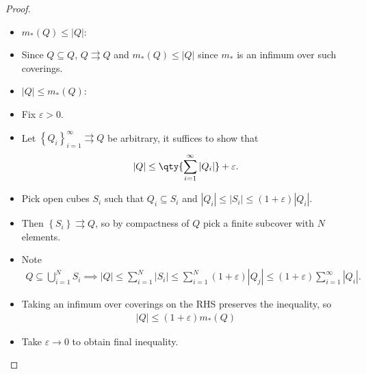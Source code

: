 \begin{solution}

\envlist

\begin{proof}

\envlist

\begin{itemize}
\item
  \(m_*(Q) \leq {\left\lvert {Q} \right\rvert}\):
\item
  Since \(Q\subseteq Q\), \(Q\rightrightarrows Q\) and
  \(m_*(Q) \leq {\left\lvert {Q} \right\rvert}\) since \(m_*\) is an
  infimum over such coverings.
\item
  \({\left\lvert {Q} \right\rvert} \leq m_*(Q)\):
\item
  Fix \({\varepsilon}> 0\).
\item
  Let \(\left\{{Q_i}\right\}_{i=1}^\infty \rightrightarrows Q\) be
  arbitrary, it suffices to show that
  \begin{align*}{\left\lvert {Q} \right\rvert} \leq \qty{\sum_{i=1}^\infty {\left\lvert {Q_i} \right\rvert}} + {\varepsilon}.\end{align*}
\item
  Pick open cubes \(S_i\) such that \(Q_i\subseteq S_i\) and
  \({\left\lvert {Q_i} \right\rvert} \leq {\left\lvert {S_i} \right\rvert} \leq (1+{\varepsilon}){\left\lvert {Q_i} \right\rvert}\).
\item
  Then \(\left\{{S_i}\right\} \rightrightarrows Q\), so by compactness
  of \(Q\) pick a finite subcover with \(N\) elements.
\item
  Note
  \begin{align*}
  Q \subseteq \displaystyle\bigcup_{i=1}^N S_i \implies {\left\lvert {Q} \right\rvert} \leq \sum_{i=1}^N {\left\lvert {S_i} \right\rvert} \leq \sum_{i=1}^N (1+{\varepsilon}) {\left\lvert {Q_j} \right\rvert} \leq (1+{\varepsilon})\sum_{i=1}^\infty {\left\lvert {Q_i } \right\rvert} 
  .\end{align*}
\item
  Taking an infimum over coverings on the RHS preserves the inequality,
  so
  \begin{align*}{\left\lvert {Q} \right\rvert} \leq (1+{\varepsilon}) m_*(Q)\end{align*}
\item
  Take \({\varepsilon}\to 0\) to obtain final inequality.
\end{itemize}

\end{proof}


\end{solution}
